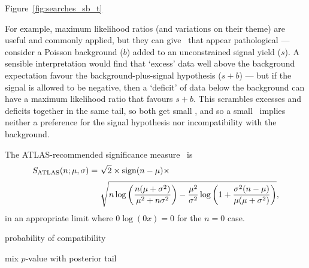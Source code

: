 Figure~\ref{fig:searches_sb_t}

For example, maximum likelihood ratios (and variations on their theme) are
useful and commonly applied, but they can give \pvalues\ that appear
pathological --- consider a Poisson background ($b$) added to an
unconstrained signal yield ($s$).
A sensible interpretation would find that `excess' data well above the
background expectation favour the background-plus-signal hypothesis ($s + b$)
---
but if the signal is allowed to be negative, then a `deficit' of data below the
background can have a maximum likelihood ratio that favours $s + b$.
This scrambles excesses and deficits together in the same tail, so both get
small \pvalues, and so a small \pvalue\ implies neither a preference for the
signal hypothesis nor incompatibility with the background.


The ATLAS-recommended significance measure~\cite{atlas_significance} is
\begin{align}
\label{eqn:significance_atlas}
S_\mathrm{ATLAS}(n; \mu, \sigma) =~&
\sqrt{2} \times
\mathrm{sign}(n - \mu) \times
\\[0.2em] \nonumber
&
\sqrt{
n\log\left(\frac{n(\mu + \sigma^2)}{\mu^2 + n\sigma^2}\right)
- \frac{\mu^2}{\sigma^2}\log\left(
1 + \frac{\sigma^2(n - \mu)}{\mu(\mu + \sigma^2)}
\right)
}
,
\end{align}
in an appropriate limit where $0\log(0x) = 0$ for the $n=0$ case.




probability of compatibility~\cite{
HIGG-2018-04,
HIGG-2018-27,
IceCube2013search,
lhcb2021test,
cern2021test
}

mix $p$-value with posterior tail~\cite{lhcb2017test}

